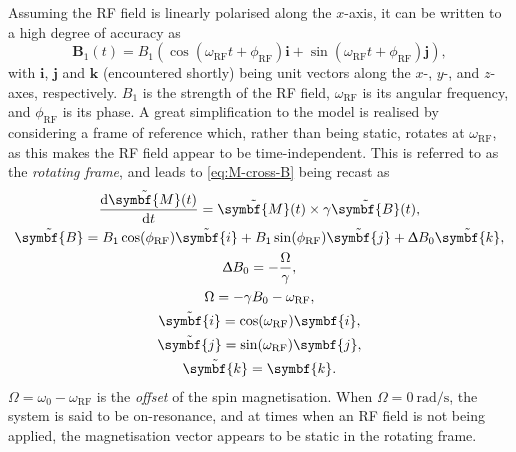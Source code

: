 Assuming the \ac{RF} field is linearly polarised along the $x$-axis, it can be
written to a high degree of accuracy as
\begin{equation}
    \symbf{B}_1(t) = B_1\left(
        \cos(\omega_{\text{RF}} t + \phi_{\text{RF}}) \symbf{i} +
        \sin(\omega_{\text{RF}} t + \phi_{\text{RF}}) \symbf{j}
    \right),
\end{equation}
with $\symbf{i}$, $\symbf{j}$ and $\symbf{k}$ (encountered shortly) being unit
vectors along the $x$-, $y$-, and $z$-axes, respectively. $B_1$ is the strength
of the \ac{RF} field, $\omega_{\text{RF}}$ is its angular frequency, and
$\phi_{\text{RF}}$ is its phase.
A great simplification to the model is realised by considering a frame
of reference which, rather than being static, rotates at $\omega_{\text{RF}}$,
as this makes the \ac{RF} field appear to be time-independent. This is referred
to as the \emph{rotating frame}, and leads to \cref{eq:M-cross-B} being recast
as
\begin{subequations}
    \begin{gather}
        \frac{\mathrm{d}\tilde{\symbf{M}}(t)}{\mathrm{d}t} = \tilde{\symbf{M}}(t) \times \gamma \tilde{\symbf{B}}(t),\\
        \tilde{\symbf{B}} =
            B_1 \cos(\phi_{\text{RF}}) \tilde{\symbf{i}} +
            B_1 \sin(\phi_{\text{RF}}) \tilde{\symbf{j}} +
            \Updelta B_0 \tilde{\symbf{k}},\\
        \Updelta B_0 = -\frac{\Omega}{\gamma},\\
        \Omega = -\gamma B_0 - \omega_{\text{RF}},\\
        \tilde{\symbf{i}} = \cos(\omega_{\text{RF}}) \symbf{i},\\
        \tilde{\symbf{j}} = \sin(\omega_{\text{RF}}) \symbf{j},\\
        \tilde{\symbf{k}} = \symbf{k}.
    \end{gather}
    \label{eq:rot-frame}
\end{subequations}
$\Omega = \omega_0 - \omega_{\text{RF}}$ is the \emph{offset} of the spin
magnetisation. When $\Omega = \qty{0}{\radian\per\second}$, the system is said to
be on-resonance, and at times when an \ac{RF} field is not being applied, the
magnetisation vector appears to be static in the rotating frame.

